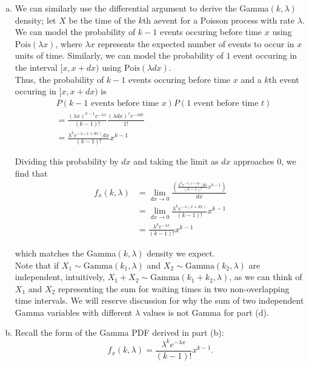 \begin{enumerate}[a)]
    \item We can similarly use the differential argument to derive the Gamma$(k, \lambda)$ density; let $X$ be the time of the $k$th aevent for a Poisson process with rate $\lambda$.
    We can model the probability of $k-1$ events occuring before time $x$ using $\mathrm{Pois}(\lambda x)$, where $\lambda x$ represents the expected number of events to occur
    in $x$ units of time. Similarly, we can model the probability of $1$ event occuring in the interval $[x, x+dx)$ using $\mathrm{Pois}(\lambda dx)$. \\

    Thus, the probability of $k-1$ events occuring before time $x$ and a $k$th event occuring in $[x, x+dx)$ is 
    \begin{align*}
        &P(\text{$k - 1$ events before time $x$}) P(\text{$1$ event before time $t$}) \\
        &= \frac{(\lambda x)^{k-1} e^{-\lambda x}}{(k-1)!} \frac{(\lambda dx)^{1} e^{-\lambda dx}}{1!} \\
        &= \frac{\lambda^k e^{-\lambda (x+dx)}dx}{(k-1)!}x^{k-1}
    \end{align*}

    Dividing this probability by $dx$ and taking the limit as $dx$ approaches $0$, we find that
    \begin{align*}
        f_x(k, \lambda) &= \lim_{dx \to 0} \frac{\left( \frac{\lambda^k e^{-\lambda (x+dx)}dx}{(k-1)!}x^{k-1} \right) }{dx} \\
        &= \lim_{dx \to 0} \frac{\lambda^k e^{-\lambda (x+dx)}}{(k-1)!} x^{k-1} \\
        &= \frac{\lambda^k e^{-\lambda x}}{(k-1)!} x^{k-1}
    \end{align*}

    which matches the Gamma$(k, \lambda)$ density we expect. \\

    Note that if $X_1 \sim \mathrm{Gamma}(k_1, \lambda)$ and $X_2 \sim \mathrm{Gamma}(k_2, \lambda)$ are independent, intuitively, 
    $X_1 + X_2 \sim \mathrm{Gamma}(k_1 + k_2, \lambda)$, as we can think of $X_1$ and $X_2$ representing the sum for waiting times in two non-overlapping time intervals.
    We will reserve discussion for why the sum of two independent Gamma variables with different $\lambda$ values is not Gamma for part (d). 
    
    \item Recall the form of the Gamma PDF derived in part (b): 
    \[
        f_x(k, \lambda) = \frac{\lambda^k e^{-\lambda x}}{(k-1)!} x^{k-1}.
    \]


\end{enumerate}
